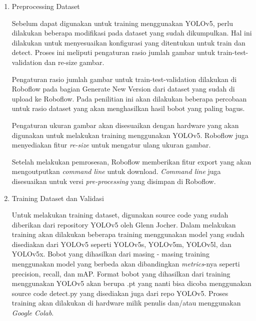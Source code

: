 \begin{enumerate}
  \item Preprocessing Dataset
  \par Sebelum dapat digunakan untuk training menggunakan YOLOv5, perlu dilakukan beberapa modifikasi pada dataset yang sudah dikumpulkan. Hal ini dilakukan untuk menyesuaikan konfigurasi 
  yang ditentukan untuk train dan detect. Proses ini meliputi pengaturan rasio jumlah gambar untuk train-test-validation dan re-size gambar.
  \par Pengaturan rasio jumlah gambar untuk train-test-validation dilakukan di Roboflow pada bagian Generate New Version dari dataset yang sudah di upload ke Roboflow. Pada penilitian ini akan dilakukan beberapa percobaan untuk rasio dataset yang akan menghasilkan hasil bobot yang paling bagus.
  \par Pengaturan ukuran gambar akan disesuaikan dengan hardware yang akan digunakan untuk melakukan training menggunakan YOLOv5. Roboflow juga menyediakan fitur \emph{re-size} untuk mengatur ulang
  ukuran gambar.
  \par Setelah melakukan pemrosesan, Roboflow memberikan fitur export yang akan mengoutputkan \emph{command line} untuk download. \emph{Command line} juga disesuaikan untuk versi \emph{pre-processing} yang disimpan
  di Roboflow.

  \item Training Dataset dan Validasi
  \par Untuk melakukan training dataset, digunakan source code yang sudah diberikan dari repository YOLOv5 oleh Glenn Jocher. Dalam melakukan training akan dilakukan beberapa training menggunakan model yang sudah disediakan
  dari YOLOv5 seperti YOLOv5s, YOLOv5m, YOLOv5l, dan YOLOv5x. Bobot yang dihasilkan dari masing - masing training menggunakan model yang berbeda akan dibandingkan \emph{metrics}-nya seperti precision, recall, dan mAP. Format bobot yang dihasilkan
  dari training menggunakan YOLOv5 akan berupa .pt yang nanti bisa dicoba menggunakan source code detect.py yang disediakan juga dari repo YOLOv5.
  Proses training akan dilakukan di hardware milik penulis dan/atau menggunakan \emph{Google Colab}.


\end{enumerate}
